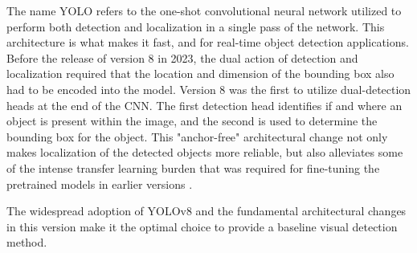 \documentclass{erauthesis}
\begin{document}
The name YOLO refers to the one-shot convolutional neural network utilized to perform both detection and localization in a single pass of the network.
This architecture is what makes it fast, and for real-time object detection applications. 
Before the release of version 8 in 2023, the dual action of detection and localization required that the location and dimension of the bounding box also had to be encoded into the model.
Version 8 was the first to utilize dual-detection heads at the end of the CNN.
The first detection head identifies if and where an object is present within the image, and the second is used to determine the bounding box for the object.
This "anchor-free" architectural change not only makes localization of the detected objects more reliable, but also alleviates some of the intense transfer learning burden that was required for fine-tuning the pretrained models in earlier versions \cite{ultralytics}.

The widespread adoption of YOLOv8 and the fundamental architectural changes in this version make it the optimal choice to provide a baseline visual detection method.









\end{document}

